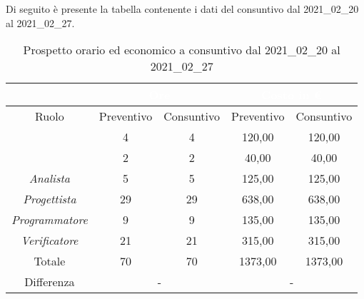 Di seguito è presente la tabella contenente i dati del consuntivo dal 2021\_02\_20 al 2021\_02\_27.
\begin{table}[H]
	\centering
	\begin{tabular}{|c|c|c|c|c|}
		\rowcolor{darkblue} 
		&\multicolumn{2}{c|}{\textcolor{white}{Ore}}&\multicolumn{2}{c|}{\textcolor{white}{Costo in €}}\\ \hline
		Ruolo			&	Preventivo				&	Consuntivo		&	Preventivo	&	Consuntivo\\ \hline
		{\Responsabile}		&	4					&	4				&	120,00		&	120,00 \\ \hline
		{\Amministratore}	&	2					&	2				&	40,00		&	40,00 \\ \hline
		\textit{Analista}	&	5					&	5				&	125,00		&	125,00 \\ \hline
		\textit{Progettista}& 	29					&29 				& 	638,00		&  	638,00 \\ \hline
		\textit{Programmatore}& 9					& 	9				& 	135,00			&  	135,00 \\ \hline
		\textit{Verificatore}&	21					&	21				&	315,00		&	315,00 \\ \hline
		Totale				&	70					&	70				&	1373,00		&	1373,00 \\ \hline
		Differenza			& 	\multicolumn{2}{c|}{-} 			&\multicolumn{2}{c|}{-}\\ \hline
	\end{tabular}
	\caption{Prospetto orario ed economico a consuntivo dal 2021\_02\_20 al 2021\_02\_27}
\end{table}
